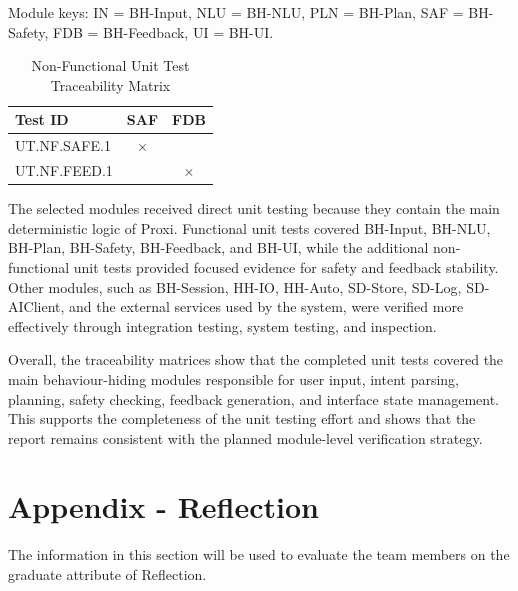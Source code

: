 \documentclass[12pt]{article}
\begin{document}
\noindent
Module keys:
IN = BH-Input, NLU = BH-NLU, PLN = BH-Plan, SAF = BH-Safety,
FDB = BH-Feedback, UI = BH-UI.

\begin{table}[htbp]
\centering
\small
\caption{Non-Functional Unit Test Traceability Matrix}
\label{tab:unit-mod-nf}
\begin{tabular}{|l|c|c|}
\hline
Test ID & SAF & FDB \\
\hline
UT.NF.SAFE.1 & $\times$ & \\
\hline
UT.NF.FEED.1 & & $\times$ \\
\hline
\end{tabular}
\end{table}

\FloatBarrier

\noindent
The selected modules received direct unit testing because they contain
the main deterministic logic of Proxi. Functional unit tests covered
BH-Input, BH-NLU, BH-Plan, BH-Safety, BH-Feedback, and BH-UI, while
the additional non-functional unit tests provided focused evidence for
safety and feedback stability. Other modules, such as BH-Session,
HH-IO, HH-Auto, SD-Store, SD-Log, SD-AIClient, and the external
services used by the system, were verified more effectively through
integration testing, system testing, and inspection.

Overall, the traceability matrices show that the completed unit tests
covered the main behaviour-hiding modules responsible for user input,
intent parsing, planning, safety checking, feedback generation, and
interface state management. This supports the completeness of the
unit testing effort and shows that the report remains consistent with
the planned module-level verification strategy.


\nocite{*}



\newpage{}
\section*{Appendix - Reflection}

The information in this section will be used to evaluate the team members on the
graduate attribute of Reflection.


\end{document}
